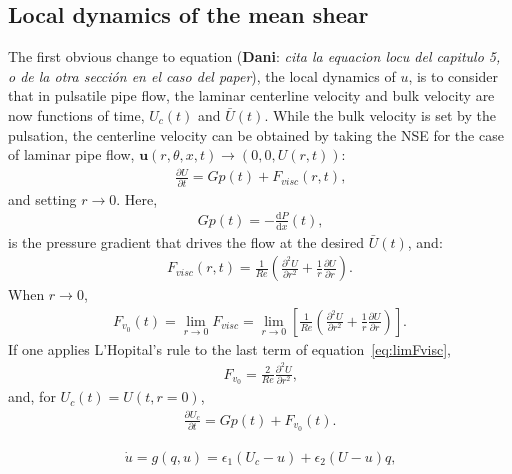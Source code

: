 \documentclass{article}
\DeclareRobustCommand{\dm}[1]{{\color{blue}(\textbf{Dani}: \textit{#1}\xspace)}}
\begin{document}
\subsection{Local dynamics of the mean shear}
The first obvious change to equation \dm{cita la equacion locu del capitulo 5, o de la otra sección en el caso del paper}, the local dynamics of $u$, is to consider that in pulsatile pipe flow, the laminar centerline velocity and bulk velocity are now functions of time, $U_{c} \left(t \right)$ and $\bar{U} \left( t \right)$. While the bulk velocity is set by the pulsation, the centerline velocity can be obtained by taking the NSE for the case of laminar pipe flow, $\pmb{u}\left(r,\theta,x,t\right)\rightarrow\left(0,0,U\left(r,t\right) \right)$:
\begin{align}
\frac{\partial U}{\partial t}= Gp\left(t\right) + F_{visc}\left(r,t\right) \text{,}
\end{align}
and setting $r \rightarrow 0$. Here,
\begin{align}
Gp\left(t\right)=- \frac{\mathrm{d} P}{\mathrm{d} x} \left(t \right) \text{,}
\end{align}
is the pressure gradient that drives the flow at the desired $\bar{U} \left( t \right)$, and:
\begin{align}
F_{visc}\left(r,t\right)= \frac{1}{Re} \left( \frac{\partial^{2}U}{\partial r^{2}} + \frac{1}{r} \frac{\partial U}{\partial r} \right) \text{.}
\end{align}
When $r \rightarrow 0$,
\begin{align}
F_{v_{0}} \left(t \right)=\lim_{r \to 0} F_{visc} = \lim_{r \to 0} \left[ \frac{1}{Re} \left( \frac{\partial^{2}U}{\partial r^{2}} + \frac{1}{r} \frac{\partial U}{\partial r} \right) \right] \text{.}
\label{eq:limFvisc}
\end{align}
If one applies L'Hopital's rule to the last term of equation~\ref{eq:limFvisc},
\begin{align}
F_{v_{0}} =  \frac{2}{Re} \frac{\partial^{2}U}{\partial r^{2}} \text{,}
\end{align}
and, for $U_{c}\left(t\right)=U\left(t,r=0\right)$,
\begin{align}
\frac{\partial U_{c}}{\partial t}=Gp\left(t\right) + F_{v_{0}}\left(t\right) \text{.}
\label{eq:centerline}
\end{align}


\begin{align}
\dot{u}=g\left(q,u\right)= \epsilon_{1} \left(U_{c}-u \right) + \epsilon_{2} \left(U-u \right)q \text{,}
\label{eq:loc_u}
\end{align}
\end{document}
